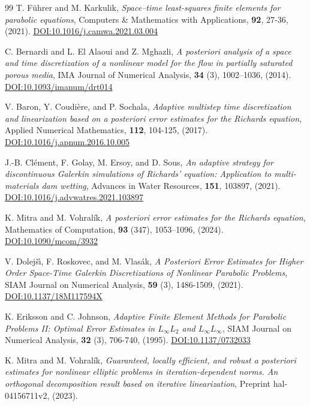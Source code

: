 \documentclass[review,11pt]{article}
\numberwithin{equation}{section}
\begin{document}
\begin{thebibliography}{99}
T. F\"uhrer and M. Karkulik, \emph{Space--time least-squares finite elements for parabolic equations}, Computers \& Mathematics with Applications, \textbf{92}, 27-36, (2021). \href{https://doi.org/10.1016/j.camwa.2021.03.004}
{DOI:10.1016/j.camwa.2021.03.004}

C. Bernardi and L. El Alaoui
and Z. Mghazli, \emph{A posteriori analysis of a space and time 
discretization of a nonlinear model for the 
flow in partially saturated porous media}, IMA Journal of Numerical Analysis, \textbf{34} (3), 1002--1036, (2014). \href{https://doi.org/10.1093/imanum/drt014}
{DOI:10.1093/imanum/drt014}


V. Baron, Y. Coudi\`ere, and P. Sochala, \emph{Adaptive multistep time discretization and linearization based on a posteriori error estimates for the {R}ichards equation}, Applied Numerical Mathematics, \textbf{112}, 104-125, (2017). \href{https://doi.org/10.1016/j.apnum.2016.10.005}
{DOI:10.1016/j.apnum.2016.10.005}


J.-B. Cl\'ement, F. Golay, M. Ersoy, and D. Sous, \emph{An adaptive strategy for discontinuous {G}alerkin simulations of {R}ichards' equation: Application to multi-materials dam wetting}, Advances in Water Resources, \textbf{151}, 103897, (2021). \href{https://doi.org/10.1016/j.advwatres.2021.103897}
{DOI:10.1016/j.advwatres.2021.103897}

K. Mitra and M. Vohral\'ik, \emph{A posteriori error estimates for the 
{R}ichards equation}, Mathematics of Computation, \textbf{93} (347), 1053--1096, (2024). \href{https://doi.org/10.1090/mcom/3932}
{DOI:10.1090/mcom/3932}


V. Dolej\v{s}\'{\i}, F. Roskovec, and M. Vlas\'{a}k, \emph{A Posteriori Error Estimates for Higher Order Space-Time {Galerkin} Discretizations of Nonlinear Parabolic Problems}, SIAM Journal on Numerical Analysis, \textbf{59} (3), 1486-1509, (2021). \href{https://doi.org/10.1137/18M117594X}
{DOI:10.1137/18M117594X}


K. Eriksson and C. Johnson, \emph{{Adaptive Finite Element Methods} for {Parabolic Problems} {II}: {Optimal Error Estimates} in {$L_\infty L_2$} and {$L_\infty L_\infty$}}, SIAM Journal on Numerical Analysis, \textbf{32} (3), 706-740, (1995). \href{https://doi.org/10.1137/0732033}
{DOI:10.1137/0732033}

K. Mitra and M. Vohral\'ik, \emph{Guaranteed, locally efficient, and robust a posteriori estimates for nonlinear elliptic problems in iteration-dependent norms. An orthogonal decomposition result based on iterative linearization}, Preprint hal-04156711v2, (2023).




\end{thebibliography}
\end{document}
